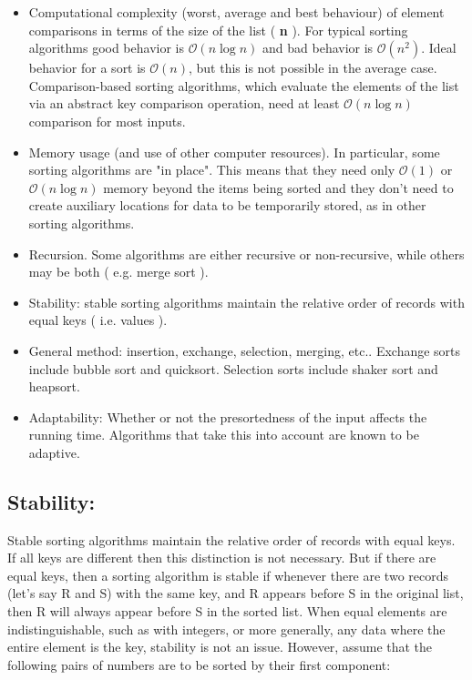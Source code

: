 \begin{itemize}
\item Computational complexity (worst, average and best behaviour) of element comparisons in terms of the size of the list ( {\bfseries n} ). For typical sorting algorithms good behavior is {\bfseries $\mathcal{O}(n\log{}n)$} and bad behavior is {\bfseries $\mathcal{O}(n^{2})$}. Ideal behavior for a sort is {\bfseries $\mathcal{O}(n)$}, but this is not possible in the average case. Comparison-based sorting algorithms, which evaluate the elements of the list via an abstract key comparison operation, need at least {\bfseries $\mathcal{O}(n\log{}n)$} comparison for most inputs.

\item Memory usage (and use of other computer resources). In particular, some sorting algorithms are "in place". This means that they need only {\bfseries $\mathcal{O}(1)$} or {\bfseries $\mathcal{O}(n\log{}n)$} memory beyond the items being sorted and they don't need to create auxiliary locations for data to be temporarily stored, as in other sorting algorithms.

\item Recursion. Some algorithms are either recursive or non-recursive, while others may be both ( e.g. merge sort ).

\item Stability: stable sorting algorithms maintain the relative order of records with equal keys ( i.e. values ).

\item General method: insertion, exchange, selection, merging, etc.. Exchange sorts include bubble sort and quicksort. Selection sorts include shaker sort and heapsort.

\item Adaptability: Whether or not the presortedness of the input affects the running time. Algorithms that take this into account are known to be adaptive.
\end{itemize} \pagebreak

\subsection{Stability:}

Stable sorting algorithms maintain the relative order of records with equal keys. If all keys are different then this
distinction is not necessary. But if there are equal keys, then a sorting algorithm is stable if whenever there are two records (let's say R and S) with the same key, and R appears before S in the original list, then R will always appear before S in the sorted list. When equal elements are indistinguishable, such as with integers, or more generally, any data where the entire element is the key, stability is not an issue. However, assume that the following pairs of numbers are to be sorted by their first component: \hfill \break

